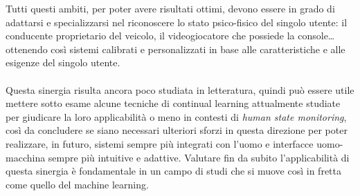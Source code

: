 Tutti questi ambiti, per poter avere risultati ottimi, devono essere in grado di adattarsi e specializzarsi nel riconoscere lo stato psico-fisico del singolo utente: il conducente proprietario del veicolo, il videogiocatore che possiede la console\ldots ottenendo così sistemi calibrati e personalizzati in base alle caratteristiche e alle esigenze del singolo utente.\\\\
Questa sinergia risulta ancora poco studiata in letteratura, quindi può essere utile mettere sotto esame alcune tecniche di continual learning attualmente studiate per giudicare la loro applicabilità o meno in contesti di \textit{human state monitoring}, così da concludere se siano necessari ulteriori sforzi in questa direzione per poter realizzare, in futuro, sistemi sempre più integrati con l'uomo e interfacce uomo-macchina sempre più intuitive e adattive. Valutare fin da subito l'applicabilità di questa sinergia è fondamentale in un campo di studi che si muove così in fretta come quello del machine learning.
\pagebreak
